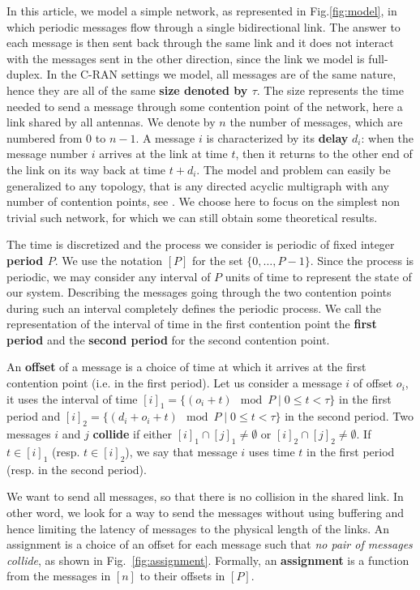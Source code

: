 \documentclass[a4paper,UKenglish,cleveref, autoref, thm-restate]{lipics-v2019}
\begin{document}
In this article, we model a simple network, as represented in Fig.\ref{fig:model}, in which periodic messages flow through a single bidirectional link. The answer to each message is then sent back through the same link and it does not interact with the messages sent in the other direction, since the link we model is full-duplex. In the C-RAN settings we model, all messages are of the same nature, hence they are all of the same \textbf{size denoted by $\tau$}. The size represents the time needed to send a message through some contention point of the network, here a link shared by all antennas. We denote by $n$ the number of messages, which are numbered from $0$ to $n-1$. A message $i$ is characterized by its \textbf{delay} $d_i$: when the message number $i$ arrives at the link at time $t$, then it returns to the other end of the link on its way back at time $t + d_i$. 
 The model and problem can easily be generalized to any topology, that is any directed acyclic multigraph with any number of contention points, see \cite{dominique2018deterministic}. We choose here to focus on the simplest non trivial such network, for which we can still obtain some theoretical results. 

The time is discretized and the process we consider is periodic of fixed integer \textbf{period $P$}. We use the notation $[P]$ for the set $\{0,\dots,P-1\}$. Since the process is periodic, we may consider any interval of $P$ units of time to represent the state of our system. Describing the messages going through the two contention points during such an interval completely defines the periodic process. We call the representation of the interval of time in the first contention point the \textbf{first period} and the \textbf{second period} for the second contention point.

An \textbf{offset} of a message is a choice of time at which it arrives
at the first contention point (i.e. in the first period). Let us consider a message $i$
of offset $o_i$, it uses the interval of time $[i]_1 = \{ (o_i + t) \mod P \mid 0 \leq t < \tau \}$ in the first period and $[i]_2 = \{ (d_i + o_i + t) \mod P \mid 0 \leq t < \tau \}$ in the second period. Two messages $i$ and $j$ \textbf{collide} if either $[i]_1 \cap [j]_1 \neq \emptyset $ or $[i]_2 \cap [j]_2 \neq \emptyset $. If $t \in [i]_1$ (resp. $t \in [i]_2$), we say that message $i$ uses time $t$ in the first period (resp. in the second period).

We want to send all messages, so that there is no collision in the shared link.
In other word, we look for a way to send the messages without using buffering and 
hence limiting the latency of messages to the physical length of the links. An assignment is a
choice of an offset for each message such that \emph{no pair of messages collide}, as shown in Fig.~\ref{fig:assignment}.
Formally, an \textbf{assignment} is a function from the messages in $[n]$ to their offsets in $[P]$.  
\end{document}

